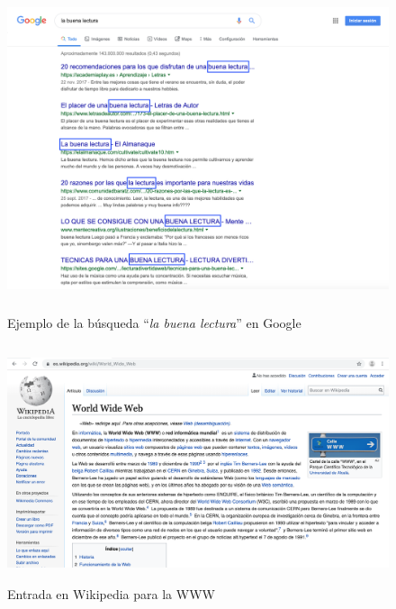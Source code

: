 \begin{figure}[H]
	\centering
	\includegraphics[height=9.5cm]{imagenes/capitulo3/ejemplo}
	\caption{Ejemplo de la búsqueda ``\textit{la buena lectura}'' en Google}
	\label{ejemplo}
\end{figure}

\begin{figure}[H]
	\centering
	\includegraphics[height=6.95cm]{imagenes/capitulo3/wikipedia}
	\caption{Entrada en Wikipedia para la WWW}
	\label{fig:wikipedia}
\end{figure}





